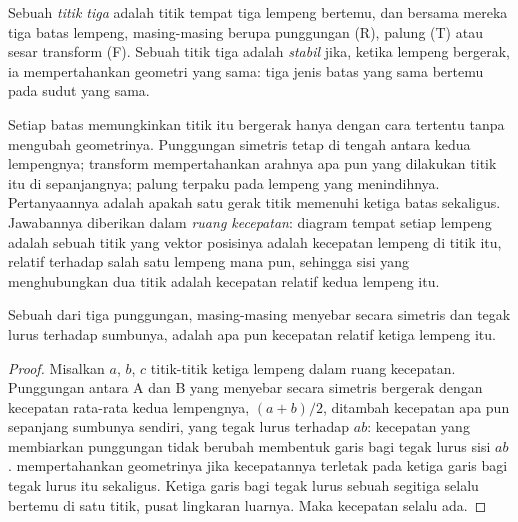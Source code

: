 \begin{definition}\label{def:b1:plate-kinematics:triple-junction}
Sebuah \emph{titik tiga} adalah titik tempat tiga lempeng bertemu, dan bersama mereka tiga batas lempeng, masing-masing berupa punggungan (R), palung (T) atau sesar transform (F). Sebuah titik tiga adalah \emph{stabil} jika, ketika lempeng bergerak, ia mempertahankan geometri yang sama: tiga jenis batas yang sama bertemu pada sudut yang sama.
\end{definition}

Setiap batas memungkinkan titik itu bergerak hanya dengan cara tertentu tanpa mengubah geometrinya. Punggungan simetris tetap di tengah antara kedua lempengnya; transform mempertahankan arahnya apa pun yang dilakukan titik itu di sepanjangnya; palung terpaku pada lempeng yang menindihnya. Pertanyaannya adalah apakah satu gerak titik memenuhi ketiga batas sekaligus. Jawabannya diberikan dalam \emph{ruang kecepatan}: diagram tempat setiap lempeng adalah sebuah titik yang vektor posisinya adalah kecepatan lempeng di titik itu, relatif terhadap salah satu lempeng mana pun, sehingga sisi yang menghubungkan dua titik adalah kecepatan relatif kedua lempeng itu.

\begin{proposition}\label{prop:b1:plate-kinematics:rrr}
Sebuah  dari tiga punggungan, masing-masing menyebar secara simetris dan tegak lurus terhadap sumbunya, adalah  apa pun kecepatan relatif ketiga lempeng itu.
\end{proposition}

\begin{proof}
Misalkan $a$, $b$, $c$ titik-titik ketiga lempeng dalam ruang kecepatan. Punggungan antara A dan B yang menyebar secara simetris bergerak dengan kecepatan rata-rata kedua lempengnya,
$(a + b)/2$, ditambah kecepatan apa pun sepanjang sumbunya sendiri, yang tegak lurus terhadap $ab$: kecepatan  yang membiarkan punggungan tidak berubah membentuk garis bagi tegak lurus sisi $ab$.  mempertahankan
geometrinya jika kecepatannya terletak pada ketiga garis bagi tegak lurus itu sekaligus.
Ketiga garis bagi tegak lurus sebuah segitiga selalu bertemu di satu titik, pusat lingkaran luarnya. Maka kecepatan  selalu ada.
\end{proof}

